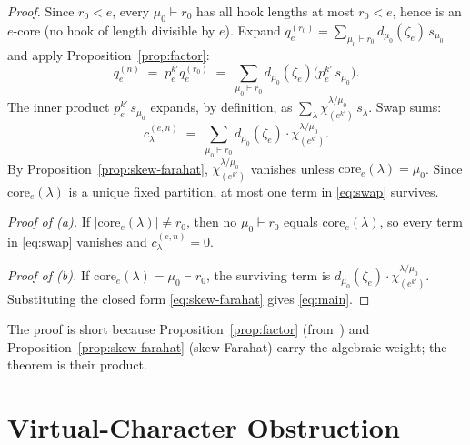 \documentclass[11pt]{article}
\theoremstyle{definition}
\theoremstyle{remark}
\newcommand{\qen}{q_e^{(n)}}
\newcommand{\qer}{q_e^{(r_0)}}
\newcommand{\zetae}{\zeta_e}
\newcommand{\core}{\mathrm{core}}
\begin{document}
\begin{proof}
Since $r_0<e$, every $\mu_0\vdash r_0$ has all hook lengths at most
$r_0<e$, hence is an $e$-core (no hook of length divisible by $e$). Expand
$\qer=\sum_{\mu_0\vdash r_0}d_{\mu_0}(\zetae)\,s_{\mu_0}$ and apply
Proposition~\ref{prop:factor}:
\[
  \qen \;=\; p_e^{k'}\qer
  \;=\; \sum_{\mu_0\vdash r_0}d_{\mu_0}(\zetae)\bigl(p_e^{k'}\,s_{\mu_0}\bigr).
\]
The inner product $p_e^{k'}\,s_{\mu_0}$ expands, by definition, as
$\sum_\lambda\chi^{\lambda/\mu_0}_{(e^{k'})}\,s_\lambda$.
Swap sums:
\begin{equation}
\label{eq:swap}
  c_\lambda^{(e,n)} \;=\;
  \sum_{\mu_0\vdash r_0} d_{\mu_0}(\zetae)\cdot\chi^{\lambda/\mu_0}_{(e^{k'})}.
\end{equation}
By Proposition~\ref{prop:skew-farahat}, $\chi^{\lambda/\mu_0}_{(e^{k'})}$
vanishes unless $\core_e(\lambda)=\mu_0$. Since $\core_e(\lambda)$ is a
unique fixed partition, at most one term in \eqref{eq:swap} survives.

\smallskip\noindent\emph{Proof of (a).} If $|\core_e(\lambda)|\ne r_0$, then
no $\mu_0\vdash r_0$ equals $\core_e(\lambda)$, so every term in
\eqref{eq:swap} vanishes and $c_\lambda^{(e,n)}=0$.

\smallskip\noindent\emph{Proof of (b).} If $\core_e(\lambda)=\mu_0\vdash r_0$,
the surviving term is $d_{\mu_0}(\zetae)\cdot\chi^{\lambda/\mu_0}_{(e^{k'})}$.
Substituting the closed form \eqref{eq:skew-farahat} gives \eqref{eq:main}.
\end{proof}

The proof is short because Proposition~\ref{prop:factor}
(from~\cite{Cli26a}) and Proposition~\ref{prop:skew-farahat} (skew Farahat)
carry the algebraic weight; the theorem is their product.

\section{Virtual-Character Obstruction}
\label{sec:virtual}
\end{document}
